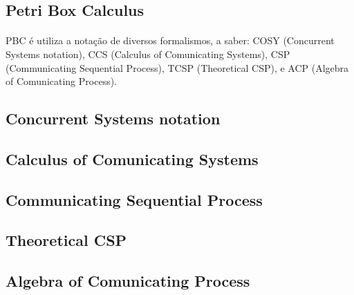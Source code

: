 \subsection{Petri Box Calculus}
\paragraph{}
PBC é utiliza a notação de diversos formalismos, a saber: COSY (Concurrent Systems notation), CCS (Calculus of Comunicating Systems),
CSP (Communicating Sequential Process), TCSP (Theoretical CSP), e ACP (Algebra of Comunicating Process).

\lipsum[1]

\subsection{Concurrent Systems notation}
\paragraph{}
\lipsum[1]

\subsection{Calculus of Comunicating Systems}
\paragraph{}
\lipsum[1]

\subsection{Communicating Sequential Process}
\paragraph{}
\lipsum[1]

\subsection{Theoretical CSP}
\paragraph{}
\lipsum[1]

\subsection{Algebra of Comunicating Process}
